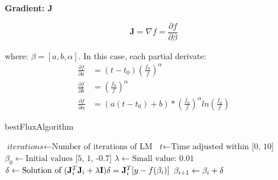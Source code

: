 \documentclass[10pt]{article}
\begin{document}
\noindent\textbf{Gradient: $\mathbf{J}$} 

$$ \mathbf{J} = \nabla f = \frac{\partial f}{\partial \beta} $$ 

where: $\beta = [a, b, \alpha]$. In this case, each partial derivate:
\begin{align*}
    \frac{\partial f}{\partial a}           &= (t - t_0)\left(\frac{f_0}{f}\right)^\alpha \\
    \frac{\partial f}{\partial b}           &= \left(\frac{f_0}{f}\right)^\alpha \\
    \frac{\partial f}{\partial \alpha}      &= (a(t-t_0)+b)*\left(\frac{f_0}{f}\right)^\alpha ln\left(\frac{f_0}{f}\right)
\end{align*}


\begin{algorithm}
\caption{bestFluxAlgorithm}\label{4months}
\begin{algorithmic}[1]
\State $\textit{iterations} \gets \text{Number of iterations of LM}$
\Statex
\State $\textit{t} \gets \text{Time adjusted within [0, 10]}$
\Statex
\State $\textit{$\beta_0$} \gets \text{Initial values [5, 1, -0.7]}$
\Statex
\State $\textit{$\lambda$} \gets \text{Small value: 0.01}$
\Statex
{}
\Statex
\State $\textit{$\delta$} \gets \text{Solution of $ (\mathbf{J}_i^{T}\mathbf{J}_i + \lambda\mathbf{I})\delta = \mathbf{J}_i^{T}[y - f(\beta_i)] $}$
\Statex
\State $\textit{$\beta_{i+1}$} \gets \text{$ \beta_i + \delta $}$
\Statex
\EndFor
\State {}
\EndProcedure
\end{algorithmic}
\end{algorithm}
\end{document}
